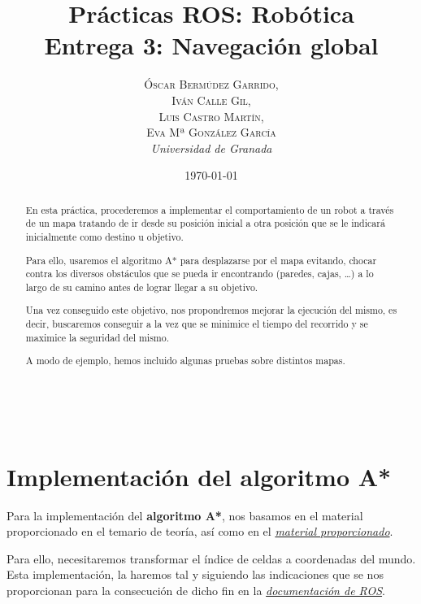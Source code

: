 \documentclass[a4paper, 11pt]{article}
\title{\textbf{Prácticas ROS: Robótica}\\ %
Entrega 3: Navegación global} %
\author{\textsc{Óscar Bermúdez Garrido,\\Iván Calle Gil,\\ Luis Castro Martín,\\ Eva Mª González García} %
\\{\textit{Universidad de Granada}}} %
\date{\today} %
\makeatletter
\renewcommand{\maketitle}{
  \begin{flushright} %
  
  {\LARGE\@title} %
  
  \vspace{50pt} %
  
  {\large\@author} %
  \\\@date %
  \vspace{40pt} %
  \end{flushright}
}
\makeatother
\begin{document}
\maketitle %

\renewcommand{\abstractname}{Resumen} %
\begin{abstract}
	En esta práctica, procederemos a implementar el comportamiento de un robot a través de un mapa
	tratando de ir desde su posición inicial a otra posición que se le indicará inicialmente como
	destino u objetivo.
	
	Para ello, usaremos el algoritmo A* para desplazarse por el mapa evitando, chocar contra los diversos
	obstáculos que se pueda ir encontrando (paredes, cajas, \dots) a lo largo de su camino antes de
	lograr llegar a su objetivo.

	Una vez conseguido este objetivo, nos propondremos mejorar la ejecución del mismo, es decir, buscaremos
	conseguir a la vez que se minimice el tiempo del recorrido y se maximice la seguridad del mismo.
	
	A modo de ejemplo, hemos incluido algunas pruebas sobre distintos mapas.
\end{abstract}


{\parskip=2pt
  \tableofcontents
}
\pagebreak


\section{Implementación del algoritmo A*}
	Para la implementación del \textbf{algoritmo A*}, nos basamos en el material proporcionado en el
	temario de teoría, así como en el \href{http://theory.stanford.edu/~amitp/GameProgramming/}
	{\textit{material proporcionado}}.

	Para ello, necesitaremos transformar el índice de celdas a coordenadas del mundo. Esta implementación,
	la haremos tal y siguiendo las indicaciones que se nos proporcionan para la consecución de dicho fin
	en la \href{http://docs.ros.org/indigo/api/costmap_2d/html/classcostmap__2d_1_1Costmap2D.html}
	{\textit{documentación de ROS}}.
		
\end{document}
